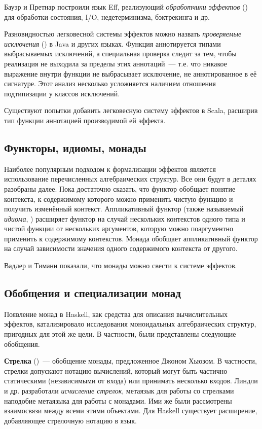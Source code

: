 Бауэр и Претнар построили язык Eff\cite{Bauer2012}, реализующий \emph{обработчики эффектов} () для обработки состояния, I/O, недетерминизма, бэктрекинга и др.

Разновидностью легковесной системы эффектов можно назвать \emph{проверяемые исключения} () в Java\cite{gosling2000java} и других языках. Функция аннотируется типами выбрасываемых исключений, а специальная проверка следит за тем, чтобы реализация не выходила за пределы этих аннотаций~--- т.е. что никакое выражение внутри функции не выбрасывает исключение, не аннотированное в её сигнатуре. Этот анализ несколько усложняется наличием отношения подтипизации у классов исключений.

Существуют попытки добавить легковесную систему эффектов в Scala\cite{Rytz2012}, расширив тип функции аннотацией производимой ей эффекта.

\subsection{Функторы, идиомы, монады}
Наиболее популярным подходом к формализации эффектов является использование перечисленных алгебраических структур. Все они будут в деталях разобраны далее. Пока достаточно сказать, что функтор обобщает понятие контекста, к содержимому которого можно применить чистую функцию и получить изменённый контекст. Аппликативный функтор (также называемый \emph{идиома}, ) расширяет функтор на случай нескольких контекстов одного типа и чистой функции от нескольких аргументов, которую можно поаргументно применить к содержимому контекстов. Монада обобщает аппликативный функтор на случай зависимости значения одного содержимого контекста от другого.

Вадлер и Тиманн\cite{Wadler2003} показали, что монады можно свести к системе эффектов.

\subsection{Обобщения и специализации монад}
Появление монад в Haskell, как средства для описания вычислительных эффектов, катализировало исследования моноидальных алгебраических структур, пригодных для этой же цели. В частности, были представлены следующие обобщения.

\textbf{Стрелка} ()~--- обобщение монады, предложенное Джоном Хьюзом\cite{Hughes2000}. В частности, стрелки допускают нотацию вычислений, который могут быть частично статическими (независимыми от входа) или принимать несколько входов. Линдли и др. разработали \emph{исчисление стрелок}\cite{Lindley2010}, метаязык для работы со стрелками наподобие метаязыка для работы с монадами. Ими же были рассмотрены взаимосвязи между всеми этими объектами\cite{Lindley2011}. Для Haskell существует расширение, добавляющее стрелочную нотацию в язык\cite{Paterson2001}.

